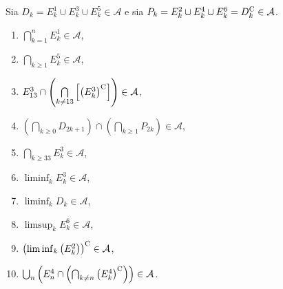 \Soluzione

Sia $D_{k} =E_{k}^{1} \cup E_{k}^{3} \cup E_{k}^{5} \in \mathcal{A}$ e sia $P_{k} =E_{k}^{2} \cup E_{k}^{4} \cup E_{k}^{6} =D_{k}^{\mathrm{C}} \in \mathcal{A}$.
\begin{enumerate}
	\item $\bigcap\limits _{k=1}^{n} E_{k}^{1} \in \mathcal{A}$,
	\item $\bigcap\limits _{k\geq 1} E_{k}^{5} \in \mathcal{A}$,
	\item $E_{13}^{3} \cap \left(\bigcap\limits _{k\neq 13}\left[\left(E_{k}^{3}\right)^{\mathrm{C}}\right]\right) \in \mathcal{A}$,
	\item $\left(\bigcap\limits _{k\geq 0} D_{2k+1}\right) \cap \left(\bigcap\limits _{k\geq 1} P_{2k}\right) \in \mathcal{A}$,
	\item $\bigcap\limits _{k\geq 33} E_{k}^{3} \in \mathcal{A}$,
	\item $\liminf _{k} E_{k}^{3} \in \mathcal{A}$,
	\item $\liminf _{k} D_{k} \in \mathcal{A}$,
	\item $\limsup _{k} E_{k}^{6} \in \mathcal{A}$,
	\item $\left(\liminf _{k}\left(E_{k}^{2}\right)\right)^{\mathrm{C}} \in \mathcal{A}$,
	\item $\bigcup _{n}\left(E_{n}^{4} \cap \left(\bigcap _{k\neq n}\left(E_{k}^{4}\right)^{\mathrm{C}}\right)\right) \in \mathcal{A}$.
\end{enumerate}

\Soluzione

